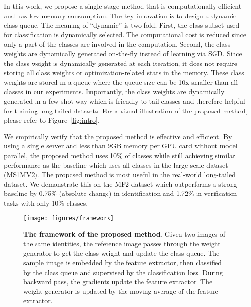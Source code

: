 \documentclass[10pt,twocolumn,letterpaper]{article}
\begin{document}
In this work, we propose a single-stage method that is computationally efficient and has low memory consumption. The key innovation is to design a dynamic class queue. The meaning of ``dynamic'' is two-fold. First, the class subset used for classification is dynamically selected. The computational cost is reduced since only a part of the classes are involved in the computation. Second, the class weights are dynamically generated on-the-fly instead of learning via SGD. Since the class weight is dynamically generated at each iteration, it does not require storing all class weights or optimization-related stats in the memory. These class weights are stored in a queue where the queue size can be 10x smaller than all classes in our experiments. Importantly, the class weights are dynamically generated in a few-shot way which is friendly to tail classes and therefore helpful for training long-tailed datasets. For a visual illustration of the proposed method, please refer to Figure~\ref{fig:intro}.

We empirically verify that the proposed method is effective and efficient. By using a single server and less than 9GB memory per GPU card without model parallel, the proposed method uses 10\% of classes while still achieving similar performance as the baseline which uses all classes in the large-scale dataset (MS1MV2\cite{deng2019arcface}). The proposed method is most useful in the real-world long-tailed dataset. We demonstrate this on the MF2\cite{nech2017level} dataset which outperforms a strong baseline by 0.75\% (absolute change) in identification and 1.72\% in verification tasks with only 10\% classes. 

\begin{figure*}[t]
   \centering
   \texttt{[image: figures/framework]}
   \caption{\textbf{The framework of the proposed method.} Given two images of the same identities, the reference image passes through the weight generator to get the class weight and update the class queue. The sample image is embedded by the feature extractor, then classified by the class queue and supervised by the classification loss. During backward pass, the gradients update the feature extractor. The weight generator is updated by the moving average of the feature extractor.\label{fig:framework}}
\end{figure*}
\end{document}
